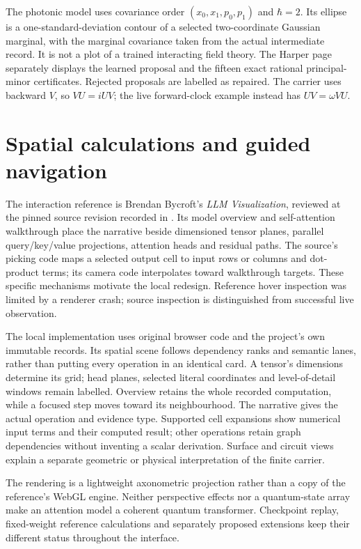 \documentclass[11pt,oneside,openany]{book}
\theoremstyle{definition}\newtheorem{definition}[theorem]{Definition}
\theoremstyle{remark}\newtheorem{remark}[theorem]{Remark}
\begin{document}
The photonic model uses covariance order $(x_0,x_1,p_0,p_1)$ and
$\hbar=2$. Its ellipse is a one-standard-deviation contour of a selected
two-coordinate Gaussian marginal, with the marginal covariance taken from
the actual intermediate record. It is not a plot of a trained interacting
field theory. The Harper page separately displays the learned proposal and
the fifteen exact rational principal-minor certificates. Rejected proposals
are labelled as repaired. The carrier uses backward $V$, so $VU=iUV$;
the live forward-clock example instead has $UV=\omega VU$.

\section{Spatial calculations and guided navigation}
The interaction reference is Brendan Bycroft's \emph{LLM Visualization},
reviewed at the pinned source revision recorded in
.
Its model overview and self-attention walkthrough place the narrative
beside dimensioned tensor planes, parallel query/key/value projections,
attention heads and residual paths. The source's picking code maps a
selected output cell to input rows or columns and dot-product terms;
its camera code interpolates toward walkthrough targets. These specific
mechanisms motivate the local redesign. Reference hover inspection was
limited by a renderer crash; source inspection is distinguished from
successful live observation.

The local implementation uses original browser code and the project's
own immutable records. Its spatial scene follows dependency ranks and
semantic lanes, rather than putting every operation in an identical card.
A tensor's dimensions determine its grid; head planes, selected literal
coordinates and level-of-detail windows remain labelled. Overview retains
the whole recorded computation, while a focused step moves toward its
neighbourhood. The narrative gives the actual operation and evidence type.
Supported cell expansions show numerical input terms and their computed
result; other operations retain graph dependencies without inventing a
scalar derivation. Surface and circuit views explain a separate geometric
or physical interpretation of the finite carrier.

The rendering is a lightweight axonometric projection rather than a copy
of the reference's WebGL engine. Neither perspective effects nor a
quantum-state array make an attention model a coherent quantum transformer.
Checkpoint replay, fixed-weight reference calculations and separately
proposed extensions keep their different status throughout the interface.
\end{document}
